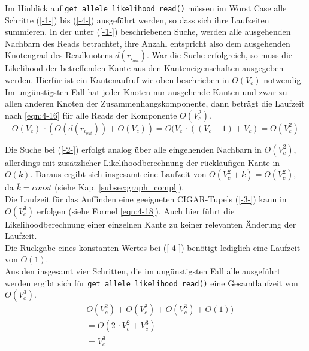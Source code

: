 Im Hinblick auf \lstinline|get_allele_likelihood_read()| müssen im Worst Case alle Schritte (\ref{-1-}) bis (\ref{-4-}) ausgeführt werden, so dass sich ihre Laufzeiten summieren. In der unter (\ref{-1-}) beschriebenen Suche, werden alle ausgehenden Nachbarn des Reads betrachtet, ihre Anzahl entspricht also dem ausgehenden Knotengrad des Readknotens $d(r_{i_{out}})$. War die Suche erfolgreich, so muss die Likelihood der betreffenden Kante aus den Kanteneigenschaften ausgegeben werden. Hierfür ist ein Kantenaufruf wie oben beschrieben in $ O(V_{c}) $ notwendig. Im ungünstigsten Fall hat jeder Knoten nur ausgehende Kanten und zwar zu allen anderen Knoten der Zusammenhangskomponente, dann beträgt die Laufzeit nach \eqref{eqn:4-16} für alle Reads der Komponente $ O(V_{c}^2)$.
\begin{equation} \label{eqn:4-16}
\tag{4-16}
O(V_{c}) \, \cdotp (O(d(r_{i_{out}})) +  O(V_{c})) = O(V_{c} \, \cdotp ((V_{c}-1) + V_{c})  = O(V_{c}^2)
\end{equation} 

Die Suche bei (\ref{-2-}) erfolgt analog über alle eingehenden Nachbarn in $ O(V_{c}^2)$, allerdings mit zusätzlicher Likelihoodberechnung der rückläufigen Kante in $O(k)$. Daraus ergibt sich insgesamt eine Laufzeit von $ O(V_{c}^2 +k) = O(V_{c}^2)$, da $\overline{k}=const$ (siehe Kap. \ref{subsec:graph_compl}).\\

Die Laufzeit für das Auffinden eine geeigneten CIGAR-Tupels (\ref{-3-}) kann in $O(V_{c}^3)$ erfolgen (siehe Formel \eqref{eqn:4-18}). Auch hier führt die Likelihoodberechnung einer einzelnen Kante zu keiner relevanten Änderung der Laufzeit.\\

Die Rückgabe eines konstanten Wertes bei (\ref{-4-}) benötigt lediglich eine Laufzeit von $ O(1) $.\\

Aus den insgesamt vier Schritten, die im ungünstigsten Fall alle ausgeführt werden ergibt sich für \lstinline|get_allele_likelihood_read()| eine Gesamtlaufzeit von $O(V_{c}^3)$. \\
\begin{equation} \label{eqn:4-17}
\tag{4-17}
\begin{aligned}
&\ {} O(V_{c}^2) + O(V_{c}^2) + O(V_{c}^3) + O(1))  \\
& \ = O(2 \, \cdotp V_{c}^2 + V_{c}^3 )\\
&\ = V_{c}^3\\
\end{aligned}
\end{equation}

